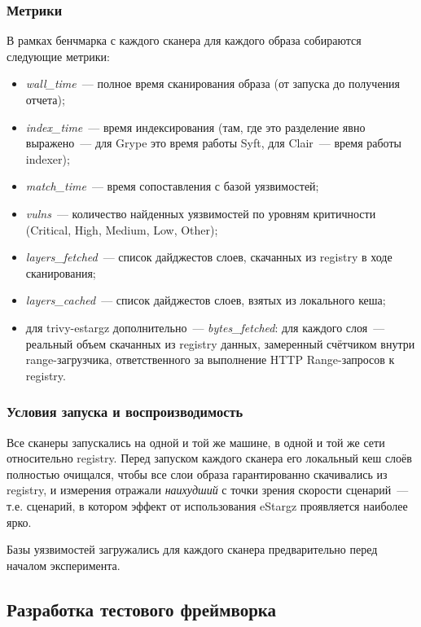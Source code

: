 \subsubsection{Метрики}

В рамках бенчмарка с каждого сканера для каждого образа собираются следующие метрики:

\begin{itemize}
\item \textit{wall\_time}~--- полное время сканирования образа (от запуска до получения отчета);
\item \textit{index\_time}~--- время индексирования (там, где это разделение явно выражено~--- для Grype это время работы Syft, для Clair~--- время работы indexer);
\item \textit{match\_time}~--- время сопоставления с базой уязвимостей;
\item \textit{vulns}~--- количество найденных уязвимостей по уровням критичности (Critical, High, Medium, Low, Other);
\item \textit{layers\_fetched}~--- список дайджестов слоев, скачанных из registry в ходе сканирования;
\item \textit{layers\_cached}~--- список дайджестов слоев, взятых из локального кеша;
\item для trivy-estargz дополнительно~--- \textit{bytes\_fetched}: для каждого слоя~--- реальный объем скачанных из registry данных, замеренный счётчиком внутри range-загрузчика, ответственного за выполнение HTTP Range-запросов к registry.
\end{itemize}

\subsubsection{Условия запуска и воспроизводимость}

Все сканеры запускались на одной и той же машине, в одной и той же сети относительно registry. Перед запуском каждого сканера его локальный кеш слоёв полностью очищался, чтобы все слои образа гарантированно скачивались из registry, и измерения отражали \textit{наихудший} с точки зрения скорости сценарий~--- т.е. сценарий, в котором эффект от использования eStargz проявляется наиболее ярко.

Базы уязвимостей загружались для каждого сканера предварительно перед началом эксперимента.

\subsection{Разработка тестового фреймворка}

